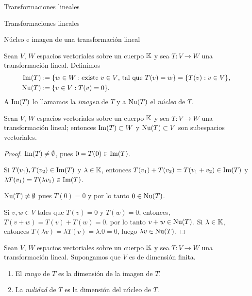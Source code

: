 \begin{chapter}{Transformaciones lineales}
\begin{section}{Transformaciones lineales}
\begin{enumex}
           
        \end{enumex}


        \end{section}
    
    
        \begin{section}{N\'ucleo e imagen de una transformaci\'on lineal}\label{seccion-nucleo-e-imagen-de-una-tl}
        
        \begin{definicion}
            Sean $V$, $W$ espacios vectoriales sobre un cuerpo $\mathbb K$ y sea $T:V \to W$ una transformación lineal.  Definimos
            \begin{align*}
                \operatorname{Im}(T) &:= \{w \in W:\text{existe $v \in V$, tal que } T(v)=w\} = \{T(v): v \in V \}, \\
                \operatorname{Nu}(T) &:= \{v \in V: T(v)=0 \}. 
            \end{align*}
            A $\operatorname{Im}(T)$ lo llamamos la \textit{imagen} de $T$ y a $ \operatorname{Nu}(T)$ el \textit{núcleo} de $T$. 
        \end{definicion}
        
        \begin{teorema}
            Sean $V$, $W$ espacios vectoriales sobre un cuerpo $\mathbb K$ y sea $T:V \to W$ una transformación lineal; entonces $\operatorname{Im}(T) \subset W$ y $\operatorname{Nu}(T) \subset V$ son subespacios vectoriales.
        \end{teorema}
        \begin{proof}
            $\operatorname{Im}(T) \ne \emptyset$, pues $0 = T(0) \in \operatorname{Im}(T)$. 
            
            Si $T(v_1),T(v_2) \in \operatorname{Im}(T)$ y $\lambda \in \mathbb K$,  entonces $T(v_1) + T(v_2) = T(v_1+v_2) \in \operatorname{Im}(T)$ y $\lambda T(v_1) = T(\lambda v_1) \in \operatorname{Im}(T)$.
            
            
            $\operatorname{Nu}(T) \ne \emptyset$ pues $T(0) =0$ y por lo tanto $0 \in \operatorname{Nu}(T)$.
            
            Si $v,w \in V$ tales que $T(v) =0$ y $T(w)=0$,  entonces, $T(v+w)= T(v)+T(w) =0$. por lo tanto $v+w \in \operatorname{Nu}(T)$. Si  $\lambda \in \mathbb K$,  entonces $T(\lambda v) = \lambda T(v) = \lambda.0 =0$, luego  $\lambda v \in \operatorname{Nu}(T)$.
        \end{proof}

    
        \begin{definicion}
            Sean $V$, $W$ espacios vectoriales sobre un cuerpo $\mathbb K$ y sea $T:V \to W$ una transformación lineal. Supongamos que $V$ es de dimensión finita.
            \begin{enumerate}
\item El \textit{rango} de $T$ es la dimensión de la imagen de $T$.
\item La \textit{nulidad} de $T$ es la dimensión del núcleo  de $T$.
            \end{enumerate}
            

\end{definicion}
\end{section}
\end{chapter}
